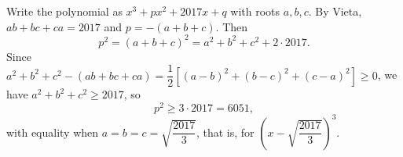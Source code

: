 Write the polynomial as $x^3+px^2+2017x+q$ with roots $a,b,c$. By Vieta, $ab+bc+ca=2017$ and $p=-(a+b+c)$. Then
\[
p^2=(a+b+c)^2=a^2+b^2+c^2+2\cdot2017 .
\]
Since $a^2+b^2+c^2-(ab+bc+ca)=\dfrac{1}{2}\left[(a-b)^2+(b-c)^2+(c-a)^2\right]\ge0$, we have $a^2+b^2+c^2\ge2017$, so
\[
p^2\ge3\cdot2017=\boxed{6051},
\]
with equality when $a=b=c=\sqrt{\dfrac{2017}{3}}$, that is, for $\left(x-\sqrt{\dfrac{2017}{3}}\right)^3$.
